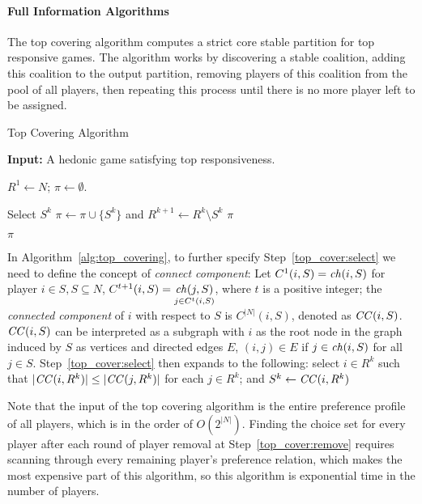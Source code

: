 \paragraph{Full Information Algorithms}
\label{para:full_pref_algos}
The top covering algorithm\cite{ALCALDE2004869, Dimitrov2006TopRA} computes a
strict core stable partition for top responsive games.
The algorithm works by discovering a stable coalition, adding this coalition
to the output partition, removing players of this coalition from the pool
of all players, then repeating this process until there is no more player left
to be assigned.

\begin{algorithm}[htb]
  \caption{Top Covering Algorithm}
  \label{alg:top_covering}
  \textbf{Input:} A hedonic game satisfying top responsiveness.

  \begin{algorithmic}[1]
  \State $R^1 \leftarrow N$; $\pi \leftarrow \emptyset$.

    \State \label{top_cover:select} Select $S^k$
    \State \label{top_cover:remove} $\pi \leftarrow \pi \cup \lbrace S^k \rbrace$ and $R^{k+1} \leftarrow  R^k \setminus S^k$
      \State \Return $\pi$
    \EndIf
  \EndFor

  \State \Return $\pi$
 \end{algorithmic}
\end{algorithm}

In Algorithm~\ref{alg:top_covering}, to further specify Step~\ref{top_cover:select}
we need to define the concept of \textit{connect component}:
Let $C^1(i, S) = \mathit{ch}(i, S)$ for player $i \in S, S \subseteq N$,
$C^{t + 1}(i, S) = \underset{j \in C^t(i, S)}{\mathit{ch}(j, S)}$, where $t$ is a positive
integer; the \textit{connected component} of $i$ with respect to $S$ is 
$C^{|N|}(i, S)$, denoted as $\mathit{CC}(i, S)$. 
$\mathit{CC}(i, S)$ can be interpreted as a subgraph with $i$ as the root node in the graph
induced by $S$ as vertices and directed edges $E$,
$(i, j) \in E$ if $j \in \mathit{ch}(i, S)$ for all $j \in S$.
Step~\ref{top_cover:select} then expands to the following: select $i\in R^k$ such
that $|\mathit{CC}(i,R^k)| \leq |\mathit{CC}(j,R^k)|$ for each $j\in R^k$;
and $S^k\leftarrow \mathit{CC}(i,R^k)$

Note that the input of the top covering algorithm is the entire preference profile
of all players, which is in the order of $O(2^{|N|})$.
Finding the choice set for every player after each round of player removal at
Step~\ref{top_cover:remove} requires scanning through every remaining player's
preference relation, which makes the most expensive part of this algorithm,
so this algorithm is exponential time in the number of players.

